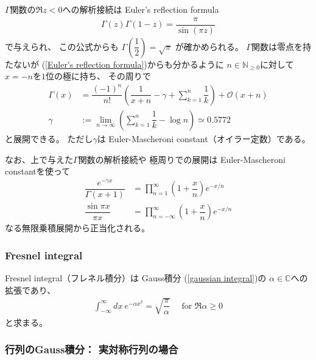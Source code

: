 $\Gamma$関数の$\Re z < 0$への解析接続は
Euler's reflection formula
\begin{align}
    \Gamma(z) \Gamma(1-z)
    =
    \dfrac{\pi}{\sin(\pi z)}
\label{Euler's reflection formula}
\end{align}
で与えられ、
この公式からも
$\Gamma \left(\dfrac{1}{2}\right) = \sqrt{\pi}$
が確かめられる。
$\Gamma$関数は零点を持たないが
(\ref{Euler's reflection formula})からも分かるように
$n \in \mathbb{N}_{\ge0}$に対して
$x = - n$を$1$位の極に持ち、
その周りで
\begin{align}
    \Gamma(x)
    &=
    \dfrac{(-1)^n}{n!}
    \left(
        \dfrac{1}{x+n} - \gamma
        + \sum_{k=1}^n \dfrac{1}{k}
    \right)
    + \mathcal{O}(x+n)
\\
    \gamma
    &:=
    \lim_{n\to\infty}
    \left(
        \sum_{k=1}^n \dfrac{1}{k} 
        -
        \log n
    \right)
    \simeq 0.5772
\end{align}
と展開できる。
ただし$\gamma$は
Euler-Mascheroni constant（オイラー定数）である。

なお、上で与えた$\Gamma$関数の解析接続や
極周りでの展開は
Euler-Mascheroni constantを使って
\begin{subequations}
\begin{align}
    \dfrac{
        e^{- \gamma x}
    }{
        \Gamma(x+1)
    }
    &=
    \prod_{n=1}^\infty
    \left(
        1 + \dfrac{x}{n}
    \right)
    e^{- x / n}
\\
    \dfrac{\sin \pi x}{\pi x}
    &=
    \prod_{n = - \infty}^\infty
    \left(
        1 + \dfrac{x}{n}
    \right)
    e^{- x / n}
\end{align}
\end{subequations}
なる無限乗積展開から正当化される。

\subsubsection{Fresnel integral}

Fresnel integral（フレネル積分）は
Gauss積分
(\ref{gaussian integral})の
$\alpha \in \mathbb{C}$への拡張であり、
\begin{align}
    \int_{-\infty}^{\infty}
    dx\ e^{- \alpha x^2}
    =
    \sqrt{
        \dfrac{\pi}{\alpha}
    }
    \quad
    \text{ for $\Re \alpha \ge 0$}
\label{fresnel integral}
\end{align}
と求まる。

\subsubsection{行列のGauss積分：
    実対称行列の場合}

